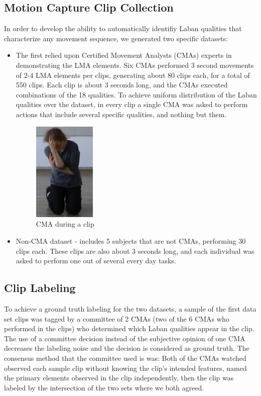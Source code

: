 \documentclass[11pt,twocolumn,varwidth=true,a4paper,fleqn]{sigchi}
\begin{document}
\subsection{Motion Capture Clip Collection}
In order to develop the ability to automatically identifiy Laban qualities that characterize any movement sequence, we generated two specific datasets:
\begin{itemize}
  \item
  The first relied upon Certified Movement Analysts (CMAs) experts in demonstrating the LMA elements. Six CMAs performed 3 second movements of 2-4 LMA elements per clips, generating about 80 clips each, for a total of 550 clips.  Each clip is about 3 seconds long, and the CMAs executed combinations of the 18 qualities.
  To achieve uniform distribution of the Laban qualities over the dataset, in every
  clip a single CMA was asked to perform actions that include several specific qualities,
  and nothing but them.
  
  \begin{figure}[h]
\centering
\includegraphics[width=30mm]{Rachelle.png}
\caption{CMA during a clip}
\label{Rachelle}
\end{figure}

\item
Non-CMA dataset - includes 5 subjects that are not CMAs, performing 30 clips each. 
These clips are also about 3 seconds long, and each individual was asked to perform one out 
of several every day tasks.
\end{itemize}
\subsection{Clip Labeling}
To achieve a ground truth labeling for the two datasets, a sample of the first data set clips was tagged by a committee of 2 CMAs (two of the 6 CMAs who performed in the clips) who determined which Laban qualities appear in the clip. The use of a committee decision instead of the subjective opinion of one CMA decreases the labeling noise and the decision is considered as ground truth. The consensus method that the committee used is was: Both of the CMAs watched observed each sample clip without knowing the clip's intended features, named the primary elements observed in the clip independently, then the clip was labeled by the intersection of the two sets where we both agreed. 
\end{document}
